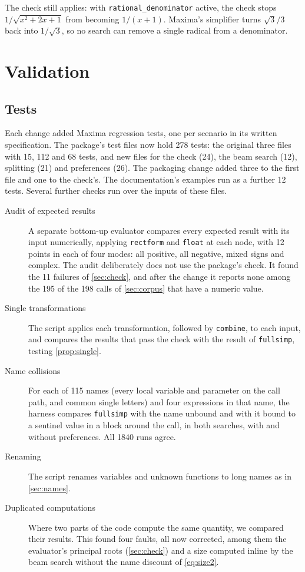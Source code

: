 \documentclass[11pt]{amsart}
\newcommand{\mx}{\lstinline[style=mx]}
\theoremstyle{definition}
\theoremstyle{remark}
\begin{document}
The check still applies: with \mx|rational_denominator| active, the check
stops $1/\sqrt{x^2+2x+1}$ from becoming $1/(x+1)$. Maxima's simplifier
turns $\sqrt3/3$ back into $1/\sqrt3$, so no search can remove a single
radical from a denominator.

\section{Validation}\label{sec:validation}

\subsection{Tests}

Each change added Maxima regression tests, one per scenario in its written
specification. The package's test files now hold 278 tests: the original
three files with 15, 112 and 68 tests, and new files for the check (24), the
beam search (12), splitting (21) and preferences (26). The packaging change
added three to the first file and one to the check's. The documentation's
examples run as a further 12 tests. Several further checks run over the
inputs of these files.

\begin{description}
\item[Audit of expected results] A separate bottom-up evaluator compares
  every expected result with its input numerically, applying \mx|rectform|
  and \mx|float| at each node, with 12 points in each of four
  modes: all positive, all negative, mixed signs and complex. The audit
  deliberately does not use the package's check. It found the 11 failures of
  \cref{sec:check}, and after the change it reports none among the 195 of the
198 calls of \cref{sec:corpus} that have a numeric value.
\item[Single transformations] The script applies each transformation,
  followed by \mx|combine|, to each input, and compares the results that pass
  the check with the result of \mx|fullsimp|, testing
  \cref{prop:single}.
\item[Name collisions] For each of 115 names (every local variable and
  parameter on the call path, and common single letters) and four
  expressions in that name, the harness compares \mx|fullsimp| with the name
  unbound and with it bound to a sentinel value in a block around the call,
  in both searches, with and without preferences. All 1840 runs agree.
\item[Renaming] The script renames variables and unknown functions to long
  names as in \cref{sec:names}.
\item[Duplicated computations] Where two parts of the code compute the same
  quantity, we compared their results. This found four faults, all now
  corrected, among them the evaluator's principal roots
  (\cref{sec:check}) and a size computed inline by the beam search without
  the name discount of \eqref{eq:size2}.
\end{description}
\end{document}
